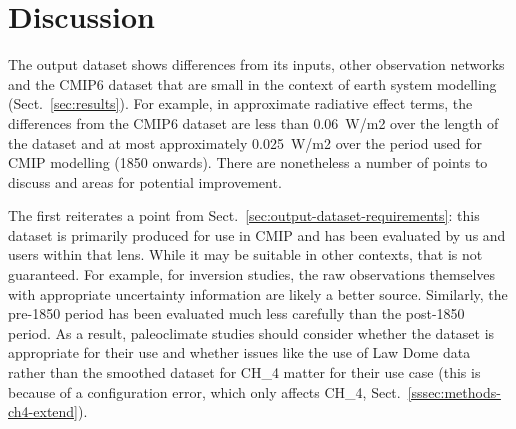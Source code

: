 \section{Discussion}
\label{sec:discussion}

The output dataset shows differences from its inputs, other observation networks and the CMIP6 dataset
that are small in the context of earth system modelling (Sect.~\ref{sec:results}).
For example, in approximate radiative effect terms, the differences from the CMIP6 dataset are less than 0.06~W/m2 over the length of the dataset
and at most approximately 0.025~W/m2 over the period used for CMIP modelling (1850 onwards).
There are nonetheless a number of points to discuss and areas for potential improvement.

The first reiterates a point from Sect.~\ref{sec:output-dataset-requirements}:
this dataset is primarily produced for use in CMIP and has been evaluated by us and users within that lens.
While it may be suitable in other contexts, that is not guaranteed.
For example, for inversion studies, the raw observations themselves with appropriate uncertainty information
are likely a better source.
Similarly, the pre-1850 period has been evaluated much less carefully than the post-1850 period.
As a result, paleoclimate studies should consider whether the dataset is appropriate for their use
and whether issues like the use of Law Dome data \citep{rubino_law-dome-dataset_2019}
rather than the smoothed \citet{menking_law-dome_2025} dataset for CH_4 matter for their use case
(this is because of a configuration error, which only affects CH_4, Sect.~\ref{sssec:methods-ch4-extend}).

